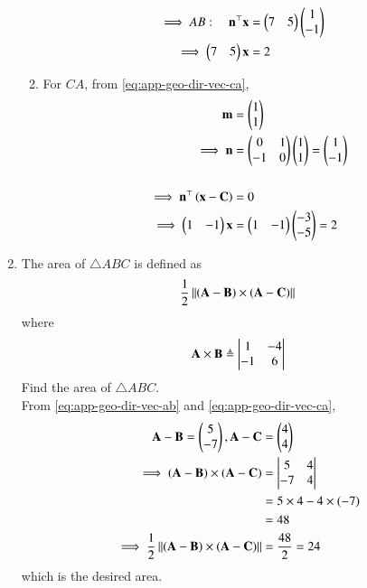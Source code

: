 \begin{enumerate}[label=\thesubsection.\arabic*.,ref=\thesubsection.\theenumi]
\begin{enumerate}
\begin{align}
	\\
	\implies
                AB: \quad  \mathbf{n}^{\top}\mathbf{x} &= \begin{pmatrix}7&5\end{pmatrix}\begin{pmatrix}1\\-1\end{pmatrix}\\    
       \implies\begin{pmatrix}7&5\end{pmatrix}\mathbf{x} &= 2
\end{align}
\item For 
$CA$, 
from 
		\eqref{eq:app-geo-dir-vec-ca}, 
\begin{align}
\mathbf{m} &= \begin{pmatrix}1 \\ 1\end{pmatrix}
\\
		\label{eq:app-geo-norm-vec-ca}
\implies \mathbf{n} 
&= \begin{pmatrix}0&1 \\ -1&0\end{pmatrix}\begin{pmatrix}1 \\ 1\end{pmatrix}
= \begin{pmatrix}1 \\ -1\end{pmatrix}\\
\\
\implies	\mathbf{n}^{\top}\left(	\mathbf{x}-\mathbf{C}\right) &= 0
\\
\implies \begin{pmatrix}1&-1\end{pmatrix}{\mathbf{x}} &= \begin{pmatrix}1&-1\end{pmatrix}\begin{pmatrix}-3 \\ -5\end{pmatrix} 
= 2 
\end{align}
\end{enumerate}

%
\item The area of $\triangle ABC$ is defined as
		\begin{align}
			\label{eq:app-tri-area-cross}
			\frac{1}{2}\left\lVert{\ensuremath{\left(\mathbf{A}-\mathbf{B}\right)}\times \ensuremath{\left(\mathbf{A}-\mathbf{C}\right)}}\right\rVert
		\end{align}
		where
		\begin{align}
			\mathbf{A}\times\mathbf{B} \triangleq \begin{vmatrix}1 & -4 \\-1 & 6\end{vmatrix}
		\end{align}
		Find the area of $\triangle ABC$.\\
\solution
From
		\eqref{eq:app-geo-dir-vec-ab}
		and
		\eqref{eq:app-geo-dir-vec-ca},
\begin{align}
	\mathbf{A}-\mathbf{B}=\begin{pmatrix}5\\-7\end{pmatrix},
	\mathbf{A}-\mathbf{C}&=\begin{pmatrix}4\\4\end{pmatrix}\\
\implies (\mathbf{A}-\mathbf{B})\times(\mathbf{A}-\mathbf{C}) &=\begin{vmatrix}5 & 4\\-7 & 4\end{vmatrix}\\
&=5\times 4-4\times (-7)\\&=48\\
\implies\frac{1}{2}\left\lVert(\mathbf{A}-\mathbf{B})\times(\mathbf{A}-\mathbf{C})\right\rVert&=\frac{48}{2}=24
\end{align}
which is the desired area.


\end{enumerate}
